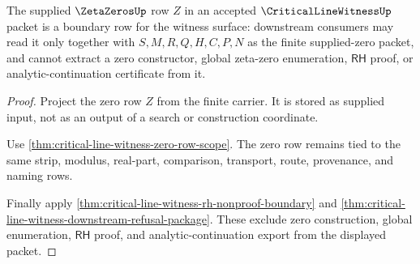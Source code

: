 \begin{theorem}
\label{thm:critical-line-witness-zeta-zero-boundary}
The supplied $\ZetaZerosUp$ row $Z$ in an accepted $\CriticalLineWitnessUp$ packet is a boundary row for the witness surface: downstream consumers may read it only together with $S,M,R,Q,H,C,P,N$ as the finite supplied-zero packet, and cannot extract a zero constructor, global zeta-zero enumeration, $\mathsf{RH}$ proof, or analytic-continuation certificate from it.
\end{theorem}
\begin{proof}
Project the zero row $Z$ from the finite carrier. It is stored as supplied input, not as an output of a search or construction coordinate.

Use \autoref{thm:critical-line-witness-zero-row-scope}. The zero row remains tied to the same strip, modulus, real-part, comparison, transport, route, provenance, and naming rows.

Finally apply \autoref{thm:critical-line-witness-rh-nonproof-boundary} and \autoref{thm:critical-line-witness-downstream-refusal-package}. These exclude zero construction, global enumeration, $\mathsf{RH}$ proof, and analytic-continuation export from the displayed packet.
\end{proof}

